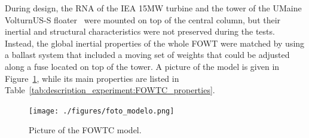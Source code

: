 During design, the RNA of the IEA 15MW turbine \citep{gaertner2020definition} and the tower of the UMaine VolturnUS-S floater~\citep{allen2020definition} were mounted on top of the central column, but their inertial and structural characteristics were not preserved during the tests. Instead, the global inertial properties of the whole FOWT were matched by using a ballast system that included a moving set of weights that could be adjusted along a fuse located on top of the tower. A picture of the model is given in Figure~\ref{fig:description_experiment:modelo}, while its main properties are listed in Table~\ref{tab:description_experiment:FOWTC_properties}.
\begin{figure}[!hbtp]
	\centering
	\texttt{[image: ./figures/foto\_modelo.png]}%
	\caption{Picture of the FOWTC model.} \label{fig:description_experiment:modelo}%
\end{figure}%


